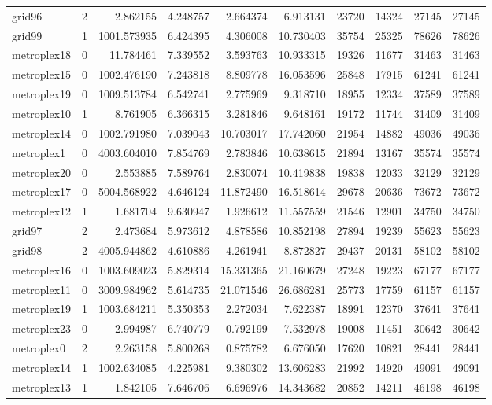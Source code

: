 \begin{longtable}{|l|r|r|r|r|r|r|r|r|r|}
grid96 & 2 & 2.862155 & 4.248757 & 2.664374 & 6.913131 & 23720 & 14324 & 27145 & 27145 \\
grid99 & 1 & 1001.573935 & 6.424395 & 4.306008 & 10.730403 & 35754 & 25325 & 78626 & 78626 \\
metroplex18 & 0 & 11.784461 & 7.339552 & 3.593763 & 10.933315 & 19326 & 11677 & 31463 & 31463 \\
metroplex15 & 0 & 1002.476190 & 7.243818 & 8.809778 & 16.053596 & 25848 & 17915 & 61241 & 61241 \\
metroplex19 & 0 & 1009.513784 & 6.542741 & 2.775969 & 9.318710 & 18955 & 12334 & 37589 & 37589 \\
metroplex10 & 1 & 8.761905 & 6.366315 & 3.281846 & 9.648161 & 19172 & 11744 & 31409 & 31409 \\
metroplex14 & 0 & 1002.791980 & 7.039043 & 10.703017 & 17.742060 & 21954 & 14882 & 49036 & 49036 \\
metroplex1 & 0 & 4003.604010 & 7.854769 & 2.783846 & 10.638615 & 21894 & 13167 & 35574 & 35574 \\
metroplex20 & 0 & 2.553885 & 7.589764 & 2.830074 & 10.419838 & 19838 & 12033 & 32129 & 32129 \\
metroplex17 & 0 & 5004.568922 & 4.646124 & 11.872490 & 16.518614 & 29678 & 20636 & 73672 & 73672 \\
metroplex12 & 1 & 1.681704 & 9.630947 & 1.926612 & 11.557559 & 21546 & 12901 & 34750 & 34750 \\
grid97 & 2 & 2.473684 & 5.973612 & 4.878586 & 10.852198 & 27894 & 19239 & 55623 & 55623 \\
grid98 & 2 & 4005.944862 & 4.610886 & 4.261941 & 8.872827 & 29437 & 20131 & 58102 & 58102 \\
metroplex16 & 0 & 1003.609023 & 5.829314 & 15.331365 & 21.160679 & 27248 & 19223 & 67177 & 67177 \\
metroplex11 & 0 & 3009.984962 & 5.614735 & 21.071546 & 26.686281 & 25773 & 17759 & 61157 & 61157 \\
metroplex19 & 1 & 1003.684211 & 5.350353 & 2.272034 & 7.622387 & 18991 & 12370 & 37641 & 37641 \\
metroplex23 & 0 & 2.994987 & 6.740779 & 0.792199 & 7.532978 & 19008 & 11451 & 30642 & 30642 \\
metroplex0 & 2 & 2.263158 & 5.800268 & 0.875782 & 6.676050 & 17620 & 10821 & 28441 & 28441 \\
metroplex14 & 1 & 1002.634085 & 4.225981 & 9.380302 & 13.606283 & 21992 & 14920 & 49091 & 49091 \\
metroplex13 & 1 & 1.842105 & 7.646706 & 6.696976 & 14.343682 & 20852 & 14211 & 46198 & 46198 \\

\end{longtable}

